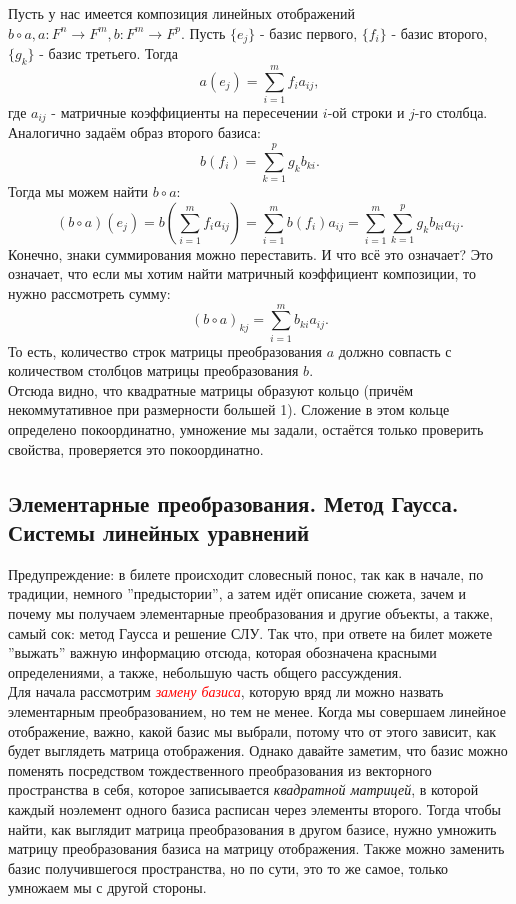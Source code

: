 \documentclass[a4paper,100pt]{article}
\theoremstyle{indented}
\theoremstyle{definition}
\theoremstyle{remark}
\begin{document}
Пусть у нас имеется композиция линейных отображений $b\circ a, a:F^n\rightarrow F^m, b: F^m \rightarrow F^p$. Пусть $\{e_j\}$ - базис первого, $\{f_i\}$ - базис второго, $\{g_k\}$ - базис третьего. Тогда
\[
    a(e_j)=\sum_{i=1}^m f_i a_{ij},
\]
где $a_{ij}$ - матричные коэффициенты на пересечении $i$-ой строки и $j$-го столбца. Аналогично задаём образ второго базиса:
\[
    b(f_i)=\sum_{k=1}^p g_k b_{ki}.
\]
Тогда мы можем найти $b\circ a$:
\[
    (b\circ a)(e_j)=b(\sum_{i=1}^m f_i a_{ij})=\sum_{i=1}^m b(f_i)a_{ij}=\sum_{i=1}^m\sum_{k=1}^p g_k b_{ki}a_{ij}.
\]
Конечно, знаки суммирования можно переставить. И что всё это означает? Это означает, что если мы хотим найти матричный коэффициент композиции, то нужно рассмотреть сумму:
\[
    (b\circ a)_{kj}=\sum_{i=1}^m b_{ki}a_{ij}.
\]
То есть, количество строк матрицы преобразования $a$ должно совпасть с количеством столбцов матрицы преобразования $b$.\\

Отсюда видно, что квадратные матрицы образуют кольцо (причём некоммутативное при размерности большей 1). Сложение в этом кольце определено покоординатно, умножение мы задали, остаётся только проверить свойства, проверяется это покоординатно.

\resetall

\subsection{Элементарные преобразования. Метод Гаусса. Системы линейных уравнений}

Предупреждение: в билете происходит словесный понос, так как в начале, по традиции, немного ''предыстории'', а затем идёт описание сюжета, зачем и почему мы получаем элементарные преобразования и другие объекты, а также, самый сок: метод Гаусса и решение СЛУ. Так что, при ответе на билет можете ''выжать'' важную информацию отсюда, которая обозначена красными определениями, а также, небольшую часть общего рассуждения.\\

Для начала рассмотрим \hypertarget{n54}{\textcolor{red}{\textit{замену базиса}}}, которую вряд ли можно назвать элементарным преобразованием, но тем не менее. Когда мы совершаем линейное отображение, важно, какой базис мы выбрали, потому что от этого зависит, как будет выглядеть матрица отображения. Однако давайте заметим, что базис можно поменять посредством тождественного преобразования из векторного пространства в себя, которое записывается \textit{квадратной матрицей}, в которой каждый ноэлемент одного базиса расписан через элементы второго. Тогда чтобы найти, как выглядит матрица преобразования в другом базисе, нужно умножить матрицу преобразования базиса на матрицу отображения. Также можно заменить базис получившегося пространства, но по сути, это то же самое, только умножаем мы с другой стороны.\
\end{document}
